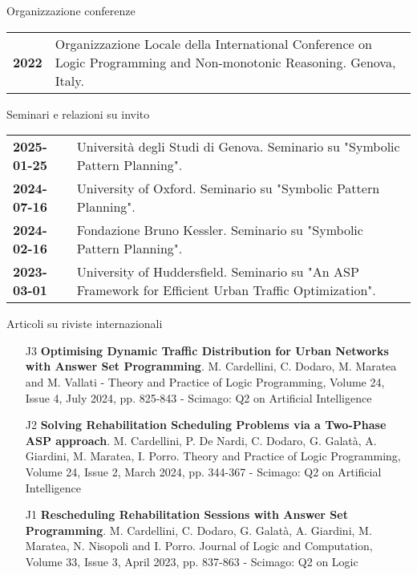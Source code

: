 \documentclass{resume} %
\begin{document}
  \begin{rSection}{Organizzazione conferenze}
	\begin{tabularx}{0.95\textwidth} {lp{14cm}}
 \textbf{2022} & Organizzazione Locale della International Conference on Logic Programming and Non-monotonic Reasoning. Genova, Italy.
  \end{tabularx}
 \end{rSection}


 \begin{rSection}{Seminari e relazioni su invito}
 	\begin{tabularx}{0.95\textwidth} {lp{14cm}}
 \textbf{2025-01-25} & Università degli Studi di Genova. Seminario su "Symbolic Pattern Planning".\\
 \textbf{2024-07-16} & University of Oxford. Seminario su "Symbolic Pattern Planning".\\
 \textbf{2024-02-16} & Fondazione Bruno Kessler. Seminario su "Symbolic Pattern Planning".\\
 \textbf{2023-03-01} & University of Huddersfield. Seminario su "An ASP Framework for Efficient Urban Traffic Optimization".\\
 \end{tabularx}

\end{rSection}

\begin{rSection}{Articoli su riviste internazionali}
\begin{enumerate}[leftmargin=5mm]
	\item[J3] \textbf{Optimising Dynamic Traffic Distribution for Urban Networks with Answer Set Programming}. M. Cardellini, C. Dodaro, M. Maratea and M. Vallati - Theory and Practice of Logic Programming,  Volume 24, Issue 4, July 2024, pp. 825-843 - Scimago: Q2 on Artificial Intelligence
	\item[J2] \textbf{Solving Rehabilitation Scheduling Problems via a Two-Phase ASP approach}. M. Cardellini, P. De Nardi, C. Dodaro, G. Galat\`a, A. Giardini, M. Maratea, I. Porro. Theory and Practice of Logic Programming, Volume 24, Issue 2, March 2024, pp. 344-367 - Scimago: Q2 on Artificial Intelligence
	\item[J1] \textbf{Rescheduling Rehabilitation Sessions with Answer Set Programming}. M. Cardellini, C. Dodaro, G. Galat\`a, A. Giardini, M. Maratea, N. Nisopoli and I. Porro. Journal of Logic and Computation, Volume 33, Issue 3, April 2023, pp. 837-863 - Scimago: Q2 on Logic
\end{enumerate}
\end{rSection}
 
\end{document}
